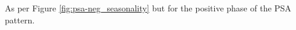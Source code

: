 \label{fig:psa-pos_seasonality}
As per Figure \ref{fig:psa-neg_seasonality} but for the positive phase of the PSA pattern.